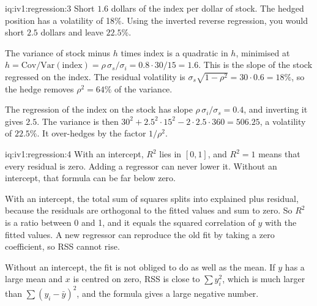 \begin{solution}{iq:iv1:regression:3}
Short $1.6$ dollars of the index per dollar of stock. The hedged position has a volatility of 18\%. Using the inverted reverse regression, you would short $2.5$ dollars and leave $22.5\%$.

The variance of stock minus $h$ times index is a quadratic in $h$, minimised at $h = \mathrm{Cov}/\mathrm{Var}(\text{index}) = \rho\,\sigma_s/\sigma_i = 0.8 \cdot 30/15 = 1.6$. This is the slope of the stock regressed on the index. The residual volatility is $\sigma_s\sqrt{1 - \rho^2} = 30 \cdot 0.6 = 18\%$, so the hedge removes $\rho^2 = 64\%$ of the variance.

The regression of the index on the stock has slope $\rho\,\sigma_i/\sigma_s = 0.4$, and inverting it gives $2.5$. The variance is then $30^2 + 2.5^2 \cdot 15^2 - 2 \cdot 2.5 \cdot 360 = 506.25$, a volatility of $22.5\%$. It over-hedges by the factor $1/\rho^2$.

\end{solution}

\begin{solution}{iq:iv1:regression:4}
With an intercept, $R^2$ lies in $[0, 1]$, and $R^2 = 1$ means that every residual is zero. Adding a regressor can never lower it. Without an intercept, that formula can be far below zero.

With an intercept, the total sum of squares splits into explained plus residual, because the residuals are orthogonal to the fitted values and sum to zero. So $R^2$ is a ratio between 0 and 1, and it equals the squared correlation of $y$ with the fitted values. A new regressor can reproduce the old fit by taking a zero coefficient, so RSS cannot rise.

Without an intercept, the fit is not obliged to do as well as the mean. If $y$ has a large mean and $x$ is centred on zero, RSS is close to $\sum y_i^2$, which is much larger than $\sum(y_i - \bar y)^2$, and the formula gives a large negative number.

\end{solution}

